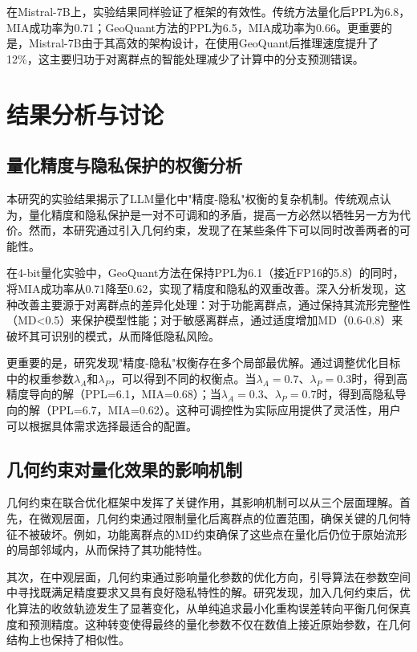 在Mistral-7B上，实验结果同样验证了框架的有效性。传统方法量化后PPL为6.8，MIA成功率为0.71；GeoQuant方法的PPL为6.5，MIA成功率为0.66。更重要的是，Mistral-7B由于其高效的架构设计，在使用GeoQuant后推理速度提升了12\%，这主要归功于对离群点的智能处理减少了计算中的分支预测错误。

\section{结果分析与讨论}

\subsection{量化精度与隐私保护的权衡分析}

本研究的实验结果揭示了LLM量化中"精度-隐私"权衡的复杂机制。传统观点认为，量化精度和隐私保护是一对不可调和的矛盾，提高一方必然以牺牲另一方为代价。然而，本研究通过引入几何约束，发现了在某些条件下可以同时改善两者的可能性。

在4-bit量化实验中，GeoQuant方法在保持PPL为6.1（接近FP16的5.8）的同时，将MIA成功率从0.71降至0.62，实现了精度和隐私的双重改善。深入分析发现，这种改善主要源于对离群点的差异化处理：对于功能离群点，通过保持其流形完整性（MD<0.5）来保护模型性能；对于敏感离群点，通过适度增加MD（0.6-0.8）来破坏其可识别的模式，从而降低隐私风险。

更重要的是，研究发现"精度-隐私"权衡存在多个局部最优解。通过调整优化目标中的权重参数$\lambda_A$和$\lambda_P$，可以得到不同的权衡点。当$\lambda_A=0.7$、$\lambda_P=0.3$时，得到高精度导向的解（PPL=6.1，MIA=0.68）；当$\lambda_A=0.3$、$\lambda_P=0.7$时，得到高隐私导向的解（PPL=6.7，MIA=0.62）。这种可调控性为实际应用提供了灵活性，用户可以根据具体需求选择最适合的配置。

\subsection{几何约束对量化效果的影响机制}

几何约束在联合优化框架中发挥了关键作用，其影响机制可以从三个层面理解。首先，在微观层面，几何约束通过限制量化后离群点的位置范围，确保关键的几何特征不被破坏。例如，功能离群点的MD约束确保了这些点在量化后仍位于原始流形的局部邻域内，从而保持了其功能特性。

其次，在中观层面，几何约束通过影响量化参数的优化方向，引导算法在参数空间中寻找既满足精度要求又具有良好隐私特性的解。研究发现，加入几何约束后，优化算法的收敛轨迹发生了显著变化，从单纯追求最小化重构误差转向平衡几何保真度和预测精度。这种转变使得最终的量化参数不仅在数值上接近原始参数，在几何结构上也保持了相似性。

